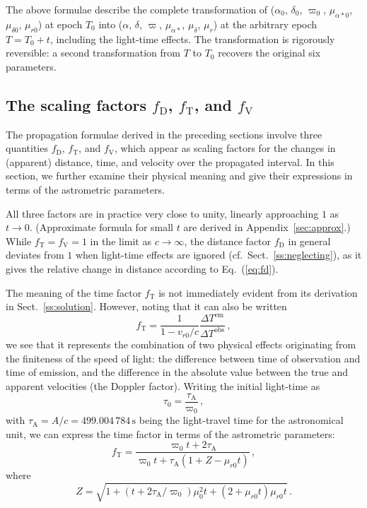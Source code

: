 \documentclass{aa}
\begin{document}
The above formulae describe the complete transformation of ($\alpha_0$, $\delta_0$, $\varpi_0$, $\mu_{\alpha*0}$, $\mu_{\delta 0}$, $\mu_{r0}$) at epoch $T_0$ into ($\alpha$, $\delta$, $\varpi$, $\mu_{\alpha*}$, $\mu_\delta$, $\mu_r$) at the arbitrary epoch $T=T_0+t$, including the light-time effects.
The transformation is rigorously reversible: a second transformation from $T$ to $T_0$ recovers the original six parameters.

\subsection{The scaling factors $f_\mathrm{D}$, $f_\mathrm{T}$, and $f_\mathrm{V}$}
\label{ss:scaling}

The propagation formulae derived in the preceding sections involve three
quantities $f_\mathrm{D}$, $f_\mathrm{T}$, and $f_\mathrm{V}$,
which appear as scaling factors for the changes
in (apparent) distance, time, and velocity over the propagated interval.
In this section, we further examine their physical meaning and
give their expressions in terms of the astrometric parameters.

All three factors are in practice very close to unity, linearly approaching
$1$ as $t\rightarrow 0$. (Approximate formula for small $t$ are
derived in Appendix~\ref{sec:approx}.) While
$f_\mathrm{T}=f_\mathrm{V}=1$ in the limit as $c\rightarrow\infty$,
the distance factor $f_\mathrm{D}$ in general deviates from $1$
when light-time effects are ignored (cf.\ Sect.~\ref{ss:neglecting}),
as it gives the relative change in distance according to Eq.~(\ref{eq:fd}).

The meaning of the time factor $f_\mathrm{T}$ is not immediately evident
from its derivation in Sect.~\ref{ss:solution}. However, noting that it can
also be written
\begin{equation}\label{eq:ft-meaning}
  f_\mathrm{T}=\frac{1}{1-v_{r0}/c}\frac{\Delta T^{\mathrm{em}}}{\Delta T^{\mathrm{obs}}}\,,
\end{equation}
 we see that it represents the combination of two physical effects
 originating from the finiteness of the speed of light: the difference
 between time of observation and time of emission, and the difference
 in the absolute value between the true and apparent velocities (the
 Doppler factor). Writing the initial light-time as
\begin{equation}
  \tau_0=\frac{\tau_\mathrm{A}}{\varpi_0}\,,
\end{equation}
with $\tau_\mathrm{A}=A/c=499.004\,784\,\mathrm s$ being the
light-travel time for the astronomical unit,
we can express the time factor in terms of the astrometric parameters:
\begin{equation}\label{eq:ft}
    f_\mathrm{T}=
    \frac{\varpi_0t+2\tau_\mathrm{A}}
    {\varpi_0t+\tau_\mathrm{A}\left(1+Z-\mu_{r0}t\right)}\,,
\end{equation}
where
\begin{equation}\label{eq:z}
    Z=
    \sqrt{
    1+\left(t+2\tau_\mathrm{A}/\varpi_0\right)\mu_0^2t+\left(2+\mu_{r0}t\right)\mu_{r0}t}\,.
\end{equation}
\end{document}
